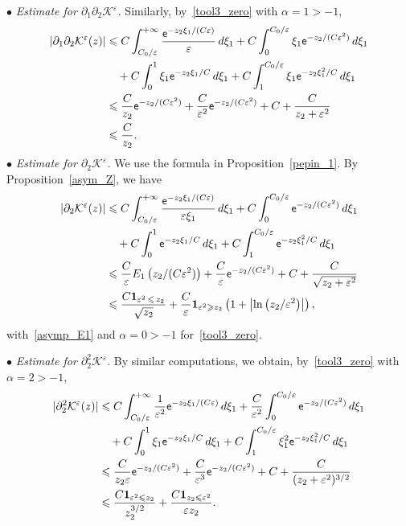 \documentclass[AHL,Unicode,longabstracts,published]{cedram}
\newcommand*\p{\partial}
\newcommand*\BK{\mathcal{K}}
\newcommand{\bfun}{\mathbf{1}}
\newcommand*\ex{{\sf e}}
\newcommand*\ii{\infty}
\newcommand*\gs{\geqslant }
\newcommand*\ls{\leqslant }
\newcommand*\e{\varepsilon}
\begin{document}
\noindent $ \bullet $ \emph{Estimate for $ \p_1 \p_2 \BK^\e $.} Similarly, by~\eqref{tool3_zero} with $ \alpha = 1 > - 1 $,
\begin{align*}
\left\lvert \p_1 \p_2 \BK^\e (z)\right\rvert &
\ls C \int_{C_0/ \e }^{+\ii}
\frac{ \ex^{- z_2 \xi_1/ (C \e)} }{ \e } \, d\xi_1 + C \int_0^{ C_0 /\e} \xi_1 \ex^{- z_2 / (C \e^2) } \, d\xi_1
\\ & \quad + C \int_0^{1} \xi_1 \ex^{- z_2 \xi_1 / C } \, d\xi_1 + C \int_1^{ C_0 / \e } \xi_1 \ex^{- z_2 \xi_1^2 / C } \, d\xi_1
\\ &
\ls \frac{C}{z_2} \ex^{- z_2 / (C \e^2) } + \frac{C}{\e^2} \ex^{- z_2 / (C \e^2) } + C + \frac{C}{ z_2 + \e^2}
\\ &
\ls \frac{C}{ z_2 }.
\end{align*}
$ \bullet $ \emph{Estimate for $ \p_2 \BK^\e $.} We use the formula in Proposition~\ref{pepin_1}. By Proposition~\ref{asym_Z}, we have
\begin{align*}
\left\lvert \p_2 \BK^\e (z) \right\rvert &
\ls C \int_{ C_0 /\e }^{+\ii}
\frac{ \ex^{- z_2 \xi_1/ (C \e)} }{\e \xi_1 } \, d\xi_1 + C \int_0^{ C_0/ \e } \ex^{- z_2 / (C \e^2) } \, d\xi_1
\\ & \quad + C \int_0^{1} \ex^{- z_2 \xi_1 / C } \, d\xi_1 + C \int_1^{ C_0 /\e} \ex^{- z_2 \xi_1^2 / C } \, d\xi_1
\\&
\ls \frac{C}{ \e } E_1 \left(z_2 / (C \e^2) \right) + \frac{ C}{\e} \ex^{- z_2 / (C \e^2) } + C + \frac{C}{\sqrt{z_2 + \e^2 } }
\\ &
\ls \frac{C \bfun_{\e^2\,\ls\,z_2} }{\sqrt{z_2 }} + \frac{C}{\e} \bfun_{\e^2 \gs z_2} \left(1 + \left\lvert \ln\left(z_2 / \e^2\right) \right\rvert\right),
\end{align*}
with~\eqref{asymp_E1} and $ \alpha= 0 > -1 $ for~\eqref{tool3_zero}.
\vspace*{4pt}

\noindent $ \bullet $ \emph{Estimate for $ \p_2^2 \BK^\e $}. By similar computations, we obtain, by~\eqref{tool3_zero} with $ \alpha = 2 > - 1 $,
\begin{align*}
\lvert \p_2^2 \BK^\e (z) \rvert &
\ls C \int_{C_0/ \e}^{+\ii}
\frac{ 1 }{ \e^2 } \ex^{- z_2 \xi_1/ (C \e)} \, d\xi_1 + \frac{ C}{\e^2} \int_0^{ C_0 /\e } \ex^{- z_2 / (C \e^2) } \, d\xi_1
\\ & \quad + C \int_0^{1} \xi_1 \ex^{- z_2 \xi_1 / C } \, d\xi_1 + C \int_1^{ C_0 /\e } \xi_1^2 \ex^{- z_2 \xi_1^2 / C } \, d\xi_1
\\ &
\ls \frac{C}{z_2 \e} \ex^{- z_2 / (C \e^2) } + \frac{C}{\e^3} \ex^{- z_2 / (C \e^2) } + C + \frac{C}{(z_2 + \e^2)^{3/2}}
\\ &
\ls \frac{C \bfun_{\e^2 \ls z_2} }{ z_2^{3/2} } + \frac{C \bfun_{ z_2 \ls \e^2 } }{\e z_2}.
\end{align*}
\end{document}
